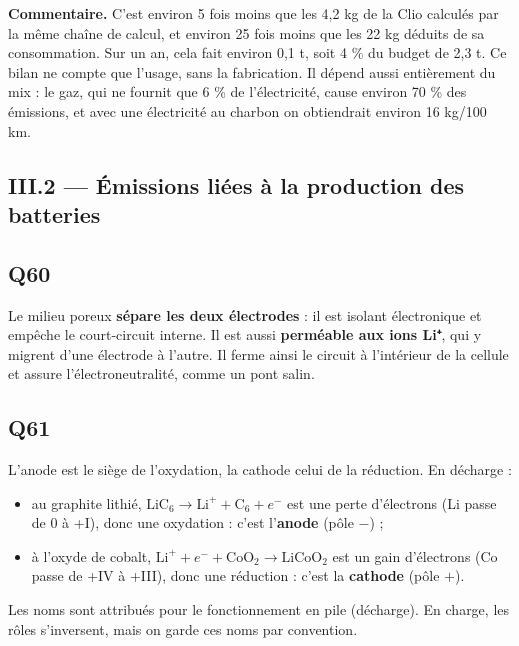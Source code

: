 \documentclass[11pt,a4paper]{article}
\providecommand{\tightlist}{\setlength{\itemsep}{0pt}\setlength{\parskip}{0pt}}
\begin{document}
\textbf{Commentaire.} C'est environ 5 fois moins que les 4,2 kg de la Clio calculés par la même chaîne de calcul, et environ 25 fois moins que les 22 kg déduits de sa consommation. Sur un an, cela fait environ 0,1 t, soit 4 \% du budget de 2,3 t. Ce bilan ne compte que l'usage, sans la fabrication. Il dépend aussi entièrement du mix : le gaz, qui ne fournit que 6 \% de l'électricité, cause environ 70 \% des émissions, et avec une électricité au charbon on obtiendrait environ 16 kg/100 km.

\hypertarget{iii.2-uxe9missions-liuxe9es-uxe0-la-production-des-batteries}{%
\subsection{III.2 --- Émissions liées à la production des batteries}\label{iii.2-uxe9missions-liuxe9es-uxe0-la-production-des-batteries}}

\hypertarget{q60}{%
\subsection{Q60}\label{q60}}

Le milieu poreux \textbf{sépare les deux électrodes} : il est isolant électronique et empêche le court-circuit interne. Il est aussi \textbf{perméable aux ions Li⁺}, qui y migrent d'une électrode à l'autre. Il ferme ainsi le circuit à l'intérieur de la cellule et assure l'électroneutralité, comme un pont salin.

\hypertarget{q61}{%
\subsection{Q61}\label{q61}}

L'anode est le siège de l'oxydation, la cathode celui de la réduction. En décharge :

\begin{itemize}
\tightlist
\item
  au graphite lithié, \(\text{LiC}_6\to\text{Li}^++\text{C}_6+e^-\) est une perte d'électrons (Li passe de 0 à +I), donc une oxydation : c'est l'\textbf{anode} (pôle \(-\)) ;
\item
  à l'oxyde de cobalt, \(\text{Li}^++e^-+\text{CoO}_2\to\text{LiCoO}_2\) est un gain d'électrons (Co passe de +IV à +III), donc une réduction : c'est la \textbf{cathode} (pôle \(+\)).
\end{itemize}

Les noms sont attribués pour le fonctionnement en pile (décharge). En charge, les rôles s'inversent, mais on garde ces noms par convention.
\end{document}
